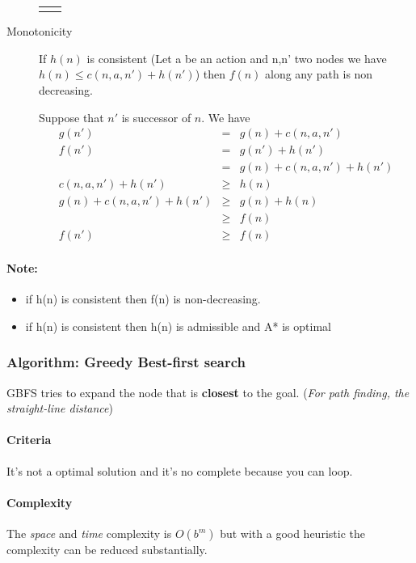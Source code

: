 \begin{description}
\begin{tabular}{m{8cm}m{7cm}}
\begin{tikzpicture}
        \end{tikzpicture}
    \end{tabular}
    

    \item[Monotonicity] If $h(n)$ is consistent (Let a be an action and n,n'
    two nodes we  have $h(n) \leq c(n,a,n') + h(n')$)  then $f(n)$ along any
    path is non decreasing.

        Suppose that $n'$ is successor of $n$. We have
        \begin{eqnarray*}
            g(n') &=& g(n) + c(n,a,n')\\
            f(n') &=& g(n') + h(n')\\
            &=& g(n) + c(n,a,n') + h(n')\\
            c(n,a,n') +h(n') &\geq& h(n)\\
            g(n) + c(n,a,n') + h(n') &\geq& g(n) + h(n)\\
            &\geq& f(n) \\
            f(n') &\geq& f(n)
        \end{eqnarray*}
\end{description}

\paragraph{Note:} 
	\begin{itemize}
		\item if h(n) is consistent then f(n) is non-decreasing.
		\item if h(n) is consistent then h(n) is admissible and A* is optimal
	\end{itemize}
\subsubsection{Algorithm: Greedy Best-first search}
GBFS tries to expand the node that is \textbf{closest} to the goal.
(\textit{For path finding, the straight-line distance})

\paragraph{Criteria} It's not a optimal solution and it's no complete
because you can loop.

\paragraph{Complexity} The \textit{space} and \textit{time} complexity
is $O(b^m)$ but with a good heuristic the complexity can be reduced
substantially.


